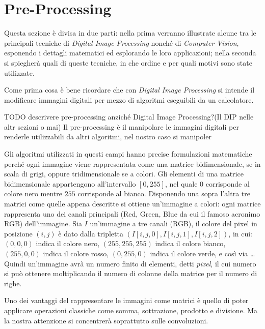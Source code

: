 \clearpage
\section{Pre-Processing}
Questa sezione è divisa in due parti: nella prima verranno illustrate alcune tra le principali tecniche di \textit{Digital Image Processing} nonché di \textit{Computer Vision}, esponendo i dettagli matematici ed esplorando le loro applicazioni; nella seconda si spiegherà quali di queste tecniche, in che ordine e per quali motivi sono state utilizzate.

Come prima cosa è bene ricordare che con \textit{Digital Image Processing} si intende il modificare immagini digitali per mezzo di algoritmi eseguibili da un calcolatore.

TODO descrivere pre-processing anziché Digital Image Processing?(Il DIP nelle altr sezioni o mai)
Il pre-processing è il manipolare le immagini digitali per renderle utilizzabili da altri algoritmi, nel nostro caso si manipoler

Gli algoritmi utilizzati in questi campi hanno precise formulazioni matematiche perché ogni immagine viene rappresentata come una matrice bidimensionale, se in scala di grigi, oppure tridimensionale se a colori.
Gli elementi di una matrice bidimensionale appartengono all'intervallo $[0,255]$, nel quale $0$ corrisponde al colore nero mentre $255$ corrisponde al bianco.
Disponendo una sopra l'altra tre matrici come quelle appena descritte si ottiene un'immagine a colori: ogni matrice rappresenta uno dei canali principali (Red, Green, Blue da cui il famoso acronimo RGB) dell'immagine.
Sia $I$ un'immagine a tre canali (RGB), il colore del pixel in posizione $(i,j)$ è dato dalla tripletta $(I[i,j,0], I[i,j,1], I[i,j,2])$, in cui: $(0,0,0)$ indica il colore nero, $(255,255,255)$ indica il colore bianco, $(255,0,0)$ indica il colore rosso, $(0,255,0)$ indica il colore verde, e così via \dots
Quindi un'immagine avrà un numero finito di elementi, detti \textit{pixel}, il cui numero si può ottenere moltiplicando il numero di colonne della matrice per il numero di righe.


Uno dei vantaggi del rappresentare le immagini come matrici è quello di poter applicare operazioni classiche come somma, sottrazione, prodotto e divisione.
Ma la nostra attenzione si concentrerà soprattutto sulle convoluzioni.

